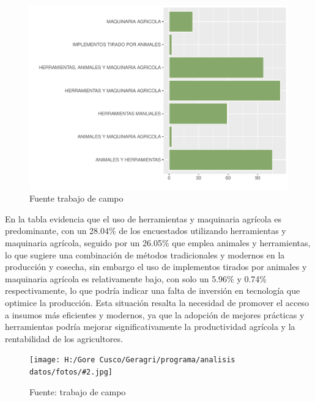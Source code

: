 \documentclass{article}\usepackage[]{graphicx}\usepackage[table]{xcolor}
\makeatletter
\def\maxwidth{ %
  \ifdim\Gin@nat@width>\linewidth
    \linewidth
  \else
    \Gin@nat@width
  \fi
}
\newenvironment{knitrout}{}{} %
\newenvironment{fotos}[2]
{\begin{figure}[H]
	\centering
	\caption{#1}
	\texttt{[image: H:/Gore Cusco/Geragri/programa/analisis datos/fotos/\#2.jpg]}
	\caption*{Fuente: trabajo de campo}}
{\end{figure}}
\newenvironment{graficas}[2]
{\begin{figure}[H]
		\centering
		\caption{#1}
		#2
		\caption*{Fuente trabajo de campo}}
{\end{figure}}
\makeatother
\begin{document}
\begin{graficas}
{Insumos que usa para la produccion y cosecha}{
\begin{knitrout}
\definecolor{shadecolor}{rgb}{0.969, 0.969, 0.969}\color{fgcolor}
\includegraphics[width=\maxwidth]{figure/fig_cuarentayuno-1} 
\end{knitrout}
}
\end{graficas}
En la tabla evidencia que el uso de herramientas y maquinaria agrícola es predominante, con un 28.04\% de los encuestados utilizando herramientas y maquinaria agrícola, seguido por un 26.05\% que emplea animales y herramientas, lo que sugiere una combinación de métodos tradicionales y modernos en la producción y cosecha, sin embargo el uso de implementos tirados por animales y maquinaria agrícola es relativamente bajo, con solo un 5.96\% y 0.74\% respectivamente, lo que podría indicar una falta de inversión en tecnología que optimice la producción. Esta situación resalta la necesidad de promover el acceso a insumos más eficientes y modernos, ya que la adopción de mejores prácticas y herramientas podría mejorar significativamente la productividad agrícola y la rentabilidad de los agricultores.
\begin{fotos}
{trabajo de campo}{39}
\end{fotos}

\end{document}

